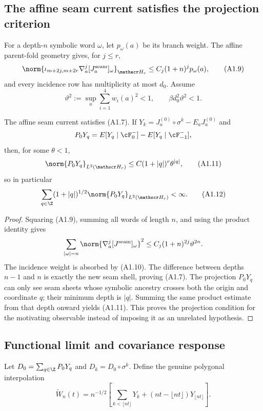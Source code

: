 \subsection{The affine seam current satisfies the projection criterion}

For a depth-$n$ symbolic word $\omega$, let $p_\omega(a)$ be its branch
weight.  The affine parent-fold geometry gives, for $j\le r$,
\[
 \norm{\iota_{m+2j,m+2r}
   \nabla_a^j[J_a^{\rm seam}]_\omega}_{\mathscr H_r}
 \le C_j(1+n)^jp_\omega(a),                               \tag{A1.9}
\]
and every incidence row has multiplicity at most $d_0$.  Assume
\[
 \vartheta^2:=\sup_a\sum_{i=1}^4w_i(a)^2<1,
 \qquad \beta d_0^2\vartheta^2<1.                         \tag{A1.10}
\]

\begin{proposition}
\label{prop:r31-a1-seam}
The affine seam current satisfies (A1.7).  If
$Y_k=J_a^{(0)}\circ\sigma^k-E_aJ_a^{(0)}$ and
\[
 P_0Y_q=E[Y_q\mid\cF_0^-]-E[Y_q\mid\cF_{-1}^-],
\]
then, for some $\theta<1$,
\[
 \norm{P_0Y_q}_{L^2(\mathscr H_r)}
 \le C(1+|q|)^r\theta^{|q|},                              \tag{A1.11}
\]
so in particular
\[
 \sum_{q\in\Z}(1+|q|)^{1/2}
 \norm{P_0Y_q}_{L^2(\mathscr H_r)}<\infty.                \tag{A1.12}
\]
\end{proposition}

\begin{proof}
Squaring (A1.9), summing all words of length $n$, and using the product
identity gives
\[
 \sum_{|\omega|=n}\norm{\nabla_a^j[J^{\rm seam}]_\omega}^2
 \le C_j(1+n)^{2j}\vartheta^{2n}.
\]
The incidence weight is absorbed by (A1.10).  The difference between depths
$n-1$ and $n$ is exactly the new seam shell, proving (A1.7).  The projection
$P_0Y_q$ can only see seam sheets whose symbolic ancestry crosses both the
origin and coordinate $q$; their minimum depth is $|q|$.  Summing the same
product estimate from that depth onward yields (A1.11).  This proves the
projection condition for the motivating observable instead of imposing it as
an unrelated hypothesis.
\end{proof}

\subsection{Functional limit and covariance response}

Let $D_0=\sum_{q\in\Z}P_0Y_q$ and $D_k=D_0\circ\sigma^k$.  Define the genuine
polygonal interpolation
\[
 \widetilde W_n(t)=n^{-1/2}\left[
   \sum_{k<\lfloor nt\rfloor}Y_k
  +(nt-\lfloor nt\rfloor)Y_{\lfloor nt\rfloor}\right].   \tag{A1.13}
\]


